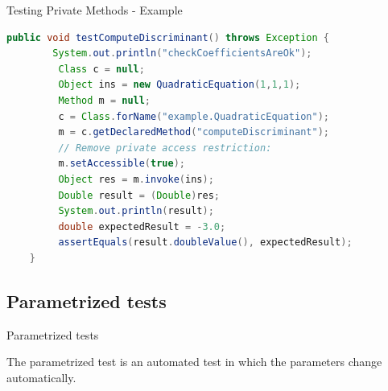 \documentclass[11pt, xcolor=svgnames]{beamer}
\begin{document}


\begin{frame}[fragile]{Testing Private Methods - Example}

\begin{lstlisting}[language=Java,basicstyle=\tiny]
    public void testComputeDiscriminant() throws Exception {
        System.out.println("checkCoefficientsAreOk");
         Class c = null;
         Object ins = new QuadraticEquation(1,1,1);
         Method m = null;
         c = Class.forName("example.QuadraticEquation");
         m = c.getDeclaredMethod("computeDiscriminant");
         // Remove private access restriction:
         m.setAccessible(true);
         Object res = m.invoke(ins);
         Double result = (Double)res;
         System.out.println(result);
         double expectedResult = -3.0;
         assertEquals(result.doubleValue(), expectedResult);
    }
\end{lstlisting}

\end{frame}


\subsection{Parametrized tests}


\begin{frame}{Parametrized tests}

The parametrized test is an automated test in which the parameters change automatically.

\end{frame}

\end{document}
